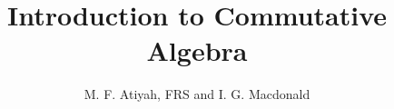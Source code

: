 \documentclass[11pt,a4paper]{article}
\title{Introduction to Commutative Algebra}
\author{M. F. Atiyah, FRS and I. G. Macdonald}
\affiliation{University of Oxford}
\begin{document}
\maketitle
\flushbottom




















\end{document}
